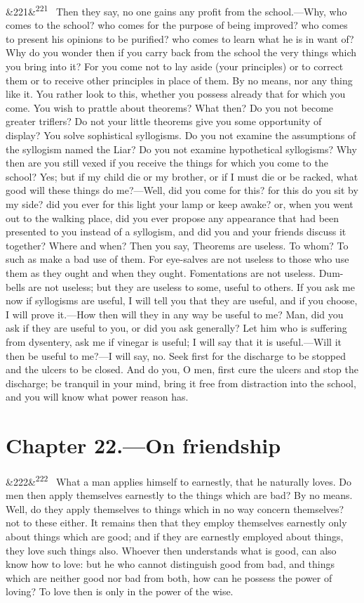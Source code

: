 \documentclass[12pt]{article}
\newcommand{\para}[1][]{\par\noindent\ifx&#1&\else\textsuperscript{\footnotesize #1}~\fi}
\begin{document}
\para[221] Then they say, no one gains any profit from the school.—Why, who comes to the school? who comes for the purpose of being improved? who comes to present his opinions to be purified? who comes to learn what he is in want of? Why do you wonder then if you carry back from the school the very things which you bring into it? For you come not to lay aside (your principles) or to correct them or to receive other principles in place of them. By no means, nor any thing like it. You rather look to this, whether you possess already that for which you come. You wish to prattle about theorems? What then? Do you not become greater triflers? Do not your little theorems give you some opportunity of display? You solve sophistical syllogisms. Do you not examine the assumptions of the syllogism named the Liar? Do you not examine hypothetical syllogisms? Why then are you still vexed if you receive the things for which you come to the school? Yes; but if my child die or my brother, or if I must die or be racked, what good will these things do me?—Well, did you come for this? for this do you sit by my side? did you ever for this light your lamp or keep awake? or, when you went out to the walking place, did you ever propose any appearance that had been presented to you instead of a syllogism, and did you and your friends discuss it together? Where and when? Then you say, Theorems are useless. To whom? To such as make a bad use of them. For eye-salves are not useless to those who use them as they ought and when they ought. Fomentations are not useless. Dum-bells are not useless; but they are useless to some, useful to others. If you ask me now if syllogisms are useful, I will tell you that they are useful, and if you choose, I will prove it.—How then will they in any way be useful to me? Man, did you ask if they are useful to you, or did you ask generally? Let him who is suffering from dysentery, ask me if vinegar is useful; I will say that it is useful.—Will it then be useful to me?—I will say, no. Seek first for the discharge to be stopped and the ulcers to be closed. And do you, O men, first cure the ulcers and stop the discharge; be tranquil in your mind, bring it free from distraction into the school, and you will know what power reason has.

\section*{Chapter 22.---On friendship}

\para[222] What a man applies himself to earnestly, that he naturally loves. Do men then apply themselves earnestly to the things which are bad? By no means. Well, do they apply themselves to things which in no way concern themselves? not to these either. It remains then that they employ themselves earnestly only about things which are good; and if they are earnestly employed about things, they love such things also. Whoever then understands what is good, can also know how to love: but he who cannot distinguish good from bad, and things which are neither good nor bad from both, how can he possess the power of loving? To love then is only in the power of the wise.
\end{document}

